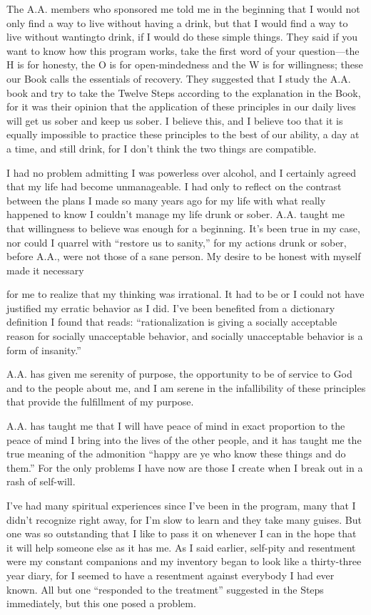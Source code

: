 The A.A. members who sponsored me told me in the beginning that I would not only find a way to live without having a drink, but that I would find a way to live without wantingto drink, if I would do these simple things. They said if you want to know how this program works, take the first word of your question—the H is for honesty, the O is for open-mindedness and the W is for willingness; these our Book calls the essentials of recovery. They suggested that I study the A.A. book and try to take the Twelve Steps according to the explanation in the Book, for it was their opinion that the application of these principles in our daily lives will get us sober and keep us sober. I believe this, and I believe too that it is equally impossible to practice these principles to the best of our ability, a day at a time, and still drink, for I don’t think the two things are compatible.

I had no problem admitting I was powerless over alcohol, and I certainly agreed that my life had become unmanageable. I had only to reflect on the contrast between the plans I made so many years ago for my life with what really happened to know I couldn’t manage my life drunk or sober. A.A. taught me that willingness to believe was enough for a beginning. It’s been true in my case, nor could I quarrel with “restore us to sanity,” for my actions drunk or sober, before A.A., were not those of a sane person. My desire to be honest with myself made it necessary

for me to realize that my thinking was irrational. It had to be or I could not have justified my erratic behavior as I did. I’ve been benefited from a dictionary definition I found that reads: “rationalization is giving a socially acceptable reason for socially unacceptable behavior, and socially unacceptable behavior is a form of insanity.”

A.A. has given me serenity of purpose, the opportunity to be of service to God and to the people about me, and I am serene in the infallibility of these principles that provide the fulfillment of my purpose.

A.A. has taught me that I will have peace of mind in exact proportion to the peace of mind I bring into the lives of the other people, and it has taught me the true meaning of the admonition “happy are ye who know these things and do them.” For the only problems I have now are those I create when I break out in a rash of self-will.

I’ve had many spiritual experiences since I’ve been in the program, many that I didn’t recognize right away, for I’m slow to learn and they take many guises. But one was so outstanding that I like to pass it on whenever I can in the hope that it will help someone else as it has me. As I said earlier, self-pity and resentment were my constant companions and my inventory began to look like a thirty-three year diary, for I seemed to have a resentment against everybody I had ever known. All but one “responded to the treatment” suggested in the Steps immediately, but this one posed a problem.

